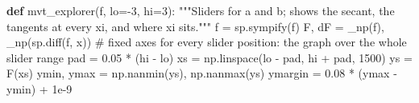 \documentclass[
  letterpaper,
  DIV=11,
  numbers=noendperiod]{scrreprt}
\newenvironment{Shaded}{\begin{snugshade}}{\end{snugshade}}
\newcommand{\CommentTok}[1]{\textcolor[rgb]{0.37,0.37,0.37}{#1}}
\newcommand{\DecValTok}[1]{\textcolor[rgb]{0.68,0.00,0.00}{#1}}
\newcommand{\FloatTok}[1]{\textcolor[rgb]{0.68,0.00,0.00}{#1}}
\newcommand{\KeywordTok}[1]{\textcolor[rgb]{0.00,0.23,0.31}{\textbf{#1}}}
\newcommand{\NormalTok}[1]{\textcolor[rgb]{0.00,0.23,0.31}{#1}}
\newcommand{\OperatorTok}[1]{\textcolor[rgb]{0.37,0.37,0.37}{#1}}
\theoremstyle{plain}
\theoremstyle{plain}
\theoremstyle{definition}
\theoremstyle{definition}
\theoremstyle{definition}
\theoremstyle{plain}
\theoremstyle{plain}
\theoremstyle{remark}
\begin{document}
\begin{Shaded}
\begin{Highlighting}[]
\KeywordTok{def}\NormalTok{ mvt\_explorer(f, lo}\OperatorTok{={-}}\DecValTok{3}\NormalTok{, hi}\OperatorTok{=}\DecValTok{3}\NormalTok{):}
    \CommentTok{"""Sliders for a and b; shows the secant, the tangents at every xi, and where xi sits."""}
\NormalTok{    f }\OperatorTok{=}\NormalTok{ sp.sympify(f)}
\NormalTok{    F, dF }\OperatorTok{=}\NormalTok{ \_np(f), \_np(sp.diff(f, x))}
    \CommentTok{\# fixed axes for every slider position: the graph over the whole slider range}
\NormalTok{    pad }\OperatorTok{=} \FloatTok{0.05} \OperatorTok{*}\NormalTok{ (hi }\OperatorTok{{-}}\NormalTok{ lo)}
\NormalTok{    xs }\OperatorTok{=}\NormalTok{ np.linspace(lo }\OperatorTok{{-}}\NormalTok{ pad, hi }\OperatorTok{+}\NormalTok{ pad, }\DecValTok{1500}\NormalTok{)}
\NormalTok{    ys }\OperatorTok{=}\NormalTok{ F(xs)}
\NormalTok{    ymin, ymax }\OperatorTok{=}\NormalTok{ np.nanmin(ys), np.nanmax(ys)}
\NormalTok{    ymargin }\OperatorTok{=} \FloatTok{0.08} \OperatorTok{*}\NormalTok{ (ymax }\OperatorTok{{-}}\NormalTok{ ymin) }\OperatorTok{+} \FloatTok{1e{-}9}


\end{Highlighting}
\end{Shaded}
\end{document}
